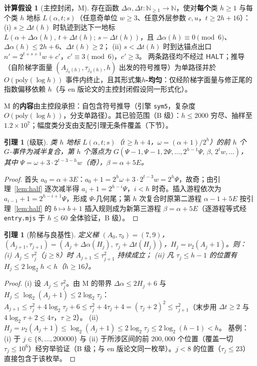 \documentclass[11pt]{ctexart}
\newtheorem{lemma}[theorem]{引理}
\theoremstyle{definition}
\newtheorem{assumption}[theorem]{计算假设}
\newcommand{\vtwo}[1]{\nu_2(#1)}
\newcommand{\HALT}{\textsf{HALT}}
\begin{document}
\begin{assumption}[主控封闭，M]\label{ass:M}
存在函数 $\Delta\alpha,\Delta t:\mathbb N_{\ge1}\to\mathbb N$，使对\textbf{每个}类 $h\ge1$ 与每个类 $h$ 地标 $L(\alpha,t;s)$（任意奇单位 $w\ge3$、任意外层参数 $c,u$，$t\ge2h{+}16$）：
(i) $s\ge\Delta t(h)$ 时轨迹到达下一地标 $L(\alpha{+}\Delta\alpha(h),\,t{+}\Delta t(h);\,s{-}\Delta t(h))$，且 $\Delta\alpha(h)\equiv0\pmod6$、$\Delta\alpha(h)\le 2h{+}6$、$\Delta t(h)\ge2$；
(ii) $s<\Delta t(h)$ 时到达锚点出口 $n'=2^{t+s+1}w+c'$，$c'\equiv3\pmod6$，$c'\ge3$。
两条路径均不经过 $\HALT$；推导（自阶梯字面量 $(A_{j_0(h)},\tau_{j_0(h)},h)$ 出发的符号推导）为单路径并於 $O(\mathrm{poly}(\log h))$ 事件内终止，且其形式集\textbf{$h$-均匀}：仅经阶梯字面量与修正尾的指数偏移依赖 $h$（与 en 版论文的主控封闭假设同一形式化）。
\end{assumption}

M 的\textbf{内容}由主控段承担：自包含符号推导（引擎 \texttt{sym5}，复杂度 $O(\mathrm{poly}(\log h))$，分支单路径）。其已验范围（B 级）：$h\le2000$ 穷尽、抽样至 $1.2\times10^7$；幅度类分支由支配引理无条件覆盖（下节）。

\begin{lemma}[级联]\label{lem:cascade}
类 $h$ 地标 $L(\alpha,t;s)$（$t\ge h{+}4$，$\omega=(\alpha{+}1)/2^{h}$）的前 $h$ 个 $G$-事件为减半复合，第 $h$ 个落点为 $G(\Psi{-}1,\Psi{-}1,2\Psi,\dots,2^{h-1}\Psi,\,\beta,\,2^{t}w,\dots)$，其中 $\Psi=\omega+3\cdot2^{t-3-h}w$（奇），$\beta=\alpha{+}5E$。
\end{lemma}
\begin{proof}
首头 $a_0=\alpha{+}3E$：$a_0{+}1=2^{h}\omega+3\cdot2^{t-3}w=2^{h}\Psi$，故奇；由引理~\ref{lem:half} 逐次减半得 $a_i{+}1=2^{h-i}\Psi$，$i<h$ 时奇。插入游程依次为 $a_{i-1}{+}1=2^{h-i+1}\Psi$，形成 $\Psi$-几何尾；第 $h$ 次复合时原第二游程 $\alpha{-}1{+}5E$ 按引理~\ref{lem:half} 的 $b{\mapsto}b{+}1$ 插入规则成为新第三游程 $\beta=\alpha{+}5E$（逐游程等式经 \texttt{entry.mjs} 于 $h\le60$ 全体验证，B 级）。
\end{proof}

\begin{lemma}[阶梯与良基性]\label{lem:ladder}
定义梯 $(A_0,\tau_0)=(7,9)$，$(A_{j+1},\tau_{j+1})=(A_j{+}\Delta\alpha(H_j),\,\tau_j{+}\Delta t(H_j))$，$H_j=\vtwo{A_j+1}$。则：
(i) $A_j\le\tau_j^2$（$j\ge8$）时 $A_{j+1}\le\tau_{j+1}^2$ 持续成立；
(ii) 凡 $\tau_j\le h{-}1$ 的位置有 $H_j\le2\log_2 h<h$（$h\ge16$）。
\end{lemma}
\begin{proof}
(i) 设 $A_j\le\tau_j^2$。由 M 的带界 $\Delta\alpha\le2H_j{+}6$ 与 $H_j\le\log_2(A_j{+}1)\le2\log_2\tau_j$：
$A_{j+1}\le\tau_j^2+4\log_2\tau_j+6\le\tau_j^2+4\tau_j+4=(\tau_j{+}2)^2\le\tau_{j+1}^2$（末步用 $\Delta t\ge2$ 与 $4\log_2\tau{+}2\le4\tau$，$\tau\ge2$）。
(ii) $H_j=\vtwo{A_j{+}1}\le\log_2(A_j{+}1)\le2\log_2\tau_j\le2\log_2(h{-}1)<h$。
基例：(i) 于 $j\in\{8,\dots,200000\}$ 与 (ii) 于所涉区间的前 $200{,}000$ 个位置（覆盖一切 $\tau_j\le10^6$）经穷举验证（B 级；与 en 版论文同一枚举）。$j<8$ 的位置（$\tau_j\le23$）直接包含于该枚举。
\end{proof}
\end{document}
